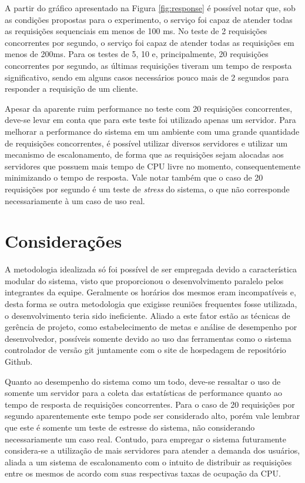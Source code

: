 A partir do gráfico apresentado na Figura \ref{fig:response} é possível notar que, sob as condições propostas para o experimento, o serviço foi capaz de atender todas as requisições sequenciais em menos de 100 ms.
No teste de 2 requisições concorrentes por segundo, o serviço foi capaz de atender todas as requisições em menos de 200ms.
Para os testes de 5, 10 e, principalmente, 20 requisições concorrentes por segundo, as últimas requisições tiveram um tempo de resposta significativo, sendo em alguns casos necessários pouco mais de 2 segundos para responder a requisição de um cliente.

Apesar da aparente ruim performance no teste com 20 requisições concorrentes, deve-se levar em conta que para este teste foi utilizado apenas um servidor.
Para melhorar a performance do sistema em um ambiente com uma grande quantidade de requisições concorrentes, é possível utilizar diversos servidores e utilizar um mecanismo de escalonamento, de forma que as requisições sejam alocadas aos servidores que possuem mais tempo de CPU livre no momento, consequentemente minimizando o tempo de resposta.
Vale notar também que o caso de 20 requisições por segundo é um teste de \emph{stress} do sistema, o que não corresponde necessariamente à um caso de uso real.

\section{Considerações}
\label{sec:consid}
A metodologia idealizada só foi possível de ser empregada devido a característica modular do sistema, visto que proporcionou o desenvolvimento paralelo pelos integrantes da equipe.
Geralmente os horários dos mesmos eram incompatíveis e, desta forma se outra metodologia que exigisse reuniões frequentes fosse utilizada, o desenvolvimento teria sido ineficiente.
Aliado a este fator estão as técnicas de gerência de projeto, como estabelecimento de metas e análise de desempenho por desenvolvedor, possíveis somente devido ao uso das ferramentas como o sistema controlador de versão git juntamente com o site de hospedagem de repositório Github.

Quanto ao desempenho do sistema como um todo, deve-se ressaltar o uso de somente um servidor para a coleta das estatísticas de performance quanto ao tempo de resposta de requisições concorrentes.
Para o caso de 20 requisições por segundo aparentemente este tempo pode ser considerado alto, porém vale lembrar que este é somente um teste de estresse do sistema, não considerando necessariamente um caso real. Contudo, para empregar o sistema futuramente considera-se a utilização de mais servidores para atender a demanda dos usuários, aliada a um sistema de escalonamento com o intuito de distribuir as requisições entre os mesmos de acordo com suas respectivas taxas de ocupação da CPU.